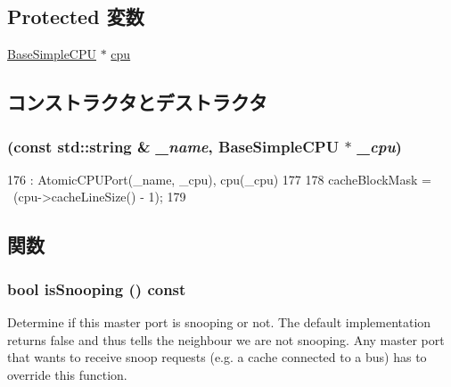 \subsection*{Protected 変数}
\begin{DoxyCompactItemize}
\item 
\hyperlink{classBaseSimpleCPU_1_1BaseSimpleCPU}{BaseSimpleCPU} $\ast$ \hyperlink{classAtomicSimpleCPU_1_1AtomicCPUDPort_a9b015cabe76f0632445ecc63fa883163}{cpu}
\end{DoxyCompactItemize}


\subsection{コンストラクタとデストラクタ}
\hypertarget{classAtomicSimpleCPU_1_1AtomicCPUDPort_a92cd757612aceef75cb77f72bed7ec83}{
\subsubsection[{AtomicCPUDPort}]{ (const std::string \& {\em \_\-name}, \/  {\bf BaseSimpleCPU} $\ast$ {\em \_\-cpu})}}
\label{classAtomicSimpleCPU_1_1AtomicCPUDPort_a92cd757612aceef75cb77f72bed7ec83}



\begin{DoxyCode}
176             : AtomicCPUPort(_name, _cpu), cpu(_cpu)
177         {
178             cacheBlockMask = ~(cpu->cacheLineSize() - 1);
179         }
\end{DoxyCode}


\subsection{関数}
\hypertarget{classAtomicSimpleCPU_1_1AtomicCPUDPort_a5ce11b7a254d3cb756d94568f7cbc25d}{
\subsubsection[{isSnooping}]{\setlength{\rightskip}{0pt plus 5cm}bool isSnooping () const}}
\label{classAtomicSimpleCPU_1_1AtomicCPUDPort_a5ce11b7a254d3cb756d94568f7cbc25d}
Determine if this master port is snooping or not. The default implementation returns false and thus tells the neighbour we are not snooping. Any master port that wants to receive snoop requests (e.g. a cache connected to a bus) has to override this function.

